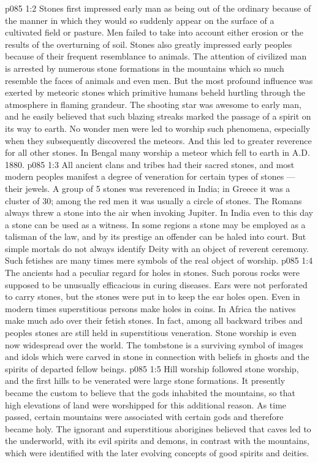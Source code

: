 \vs p085 1:2 Stones first impressed early man as being out of the ordinary because of the manner in which they would so suddenly appear on the surface of a cultivated field or pasture. Men failed to take into account either erosion or the results of the overturning of soil. Stones also greatly impressed early peoples because of their frequent resemblance to animals. The attention of civilized man is arrested by numerous stone formations in the mountains which so much resemble the faces of animals and even men. But the most profound influence was exerted by meteoric stones which primitive humans beheld hurtling through the atmosphere in flaming grandeur. The shooting star was awesome to early man, and he easily believed that such blazing streaks marked the passage of a spirit on its way to earth. No wonder men were led to worship such phenomena, especially when they subsequently discovered the meteors. And this led to greater reverence for all other stones. In Bengal many worship a meteor which fell to earth in A.D.\,1880.
\vs p085 1:3 All ancient clans and tribes had their sacred stones, and most modern peoples manifest a degree of veneration for certain types of stones --- their jewels. A group of 5 stones was reverenced in India; in Greece it was a cluster of 30; among the red men it was usually a circle of stones. The Romans always threw a stone into the air when invoking Jupiter. In India even to this day a stone can be used as a witness. In some regions a stone may be employed as a talisman of the law, and by its prestige an offender can be haled into court. But simple mortals do not always identify Deity with an object of reverent ceremony. Such fetishes are many times mere symbols of the real object of worship.
\vs p085 1:4 The ancients had a peculiar regard for holes in stones. Such porous rocks were supposed to be unusually efficacious in curing diseases. Ears were not perforated to carry stones, but the stones were put in to keep the ear holes open. Even in modern times superstitious persons make holes in coins. In Africa the natives make much ado over their fetish stones. In fact, among all backward tribes and peoples stones are still held in superstitious veneration. Stone worship is even now widespread over the world. The tombstone is a surviving symbol of images and idols which were carved in stone in connection with beliefs in ghosts and the spirits of departed fellow beings.
\vs p085 1:5 Hill worship followed stone worship, and the first hills to be venerated were large stone formations. It presently became the custom to believe that the gods inhabited the mountains, so that high elevations of land were worshipped for this additional reason. As time passed, certain mountains were associated with certain gods and therefore became holy. The ignorant and superstitious aborigines believed that caves led to the underworld, with its evil spirits and demons, in contrast with the mountains, which were identified with the later evolving concepts of good spirits and deities.
